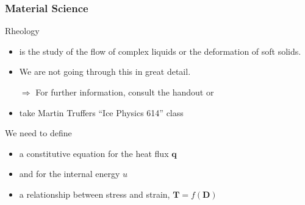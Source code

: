\documentclass[hide notes,intlimits]{beamer}
\begin{document}
\begin{frame}
  \frametitle{Material Science}
  \begin{block}{Rheology}
    \begin{itemize}
    \item is the study of the flow of complex liquids or the deformation of soft solids.
    \item We are not going through this in great detail.
    \item[$\Rightarrow$] For further information, consult the handout or
      \item take Martin Truffers ``Ice Physics 614''  class
    \end{itemize}
  \end{block}
  \begin{block}{We need to define}
    \begin{itemize}
    \item a constitutive equation for the heat flux $\mathbf{q}$
    \item and for the internal energy $u$
    \item a relationship between stress and strain, $\mathbf{T} = f(\mathbf{D})$
   \end{itemize}
  \end{block}
\end{frame}


\end{document}
